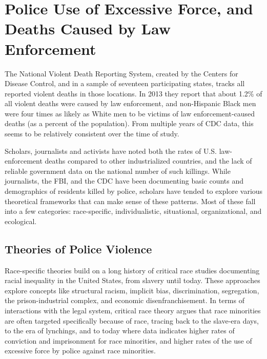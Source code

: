 \documentclass[sigconf]{acmart}
\begin{document}
\section{Police Use of Excessive Force, and Deaths Caused by Law Enforcement}
The National Violent Death Reporting System, created by the Centers for Disease Control, and  in a sample of seventeen participating states, tracks all reported violent deaths in those locations.  In 2013 they report that about 1.2\% of all violent deaths were caused by law enforcement, and non-Hispanic Black men were four times as likely as White men to be victims of law enforcement-caused deaths (as a percent of the population). \cite{cdc13}  From multiple years of CDC data, this seems to be relatively consistent over the time of study.  

Scholars, journalists and activists have noted both the rates of U.S. law-enforcement deaths compared to other industrialized countries, and the lack of reliable government data on the national number of such killings. \cite{currie16,pridemore05,dalton17,lartey15,ser16}  While journalists, the FBI, and the CDC have been documenting basic counts and demographics of residents killed by police, scholars have tended to explore various theoretical frameworks that can make sense of these patterns.  Most of these fall into a few categories: race-specific, individualistic, situational, organizational, and ecological. \cite{nix17,provine11,smith14,chaney13}

\subsection{Theories of Police Violence}
Race-specific theories build on a long history of critical race studies documenting racial inequality in the United States, from slavery until today. \cite{provine11,chaney13,meeks06,crichlow14,payne17}  These approaches explore concepts like structural racism, implicit bias, discrimination, segregation, the prison-industrial complex, and economic disenfranchisement.  In terms of interactions with the legal system, critical race theory argues that race minorities are often targeted specifically because of race, tracing back to the slave-era days, to the era of lynchings, and to today where data indicates higher rates of conviction and imprisonment for race minorities, and higher rates of the use of excessive force by police against race minorities. \cite{payne17,provine11,meeks06,chaney13,crichlow14,petro03}  
\end{document}
